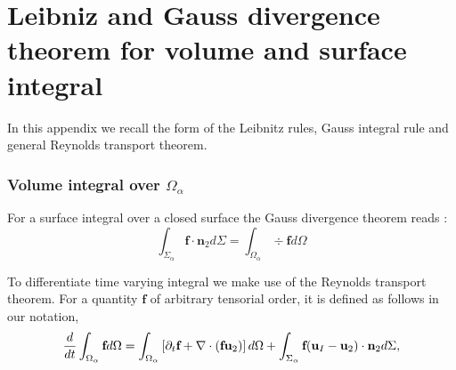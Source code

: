\section{Leibniz and Gauss divergence theorem for volume and surface integral}
\label{ap:math}


In this appendix we recall the form of the Leibnitz rules, Gauss integral rule and general Reynolds transport theorem. 
\subsubsection*{Volume integral over $\Omega_\alpha$}
For a surface integral over a closed surface the Gauss divergence theorem reads : 
\begin{equation}
    \int_{\Sigma_\alpha} \textbf{f} \cdot \textbf{n}_2 d\Sigma
    = \int_{\Omega_\alpha} \div \textbf{f}d\Omega
\end{equation}

To differentiate time varying integral we make use of the Reynolds transport theorem.
For a quantity $\textbf{f}$ of arbitrary tensorial order, it is defined  as follows in our notation, 
\begin{equation}
    \frac{d}{dt} \int_{\Omega_\alpha} \textbf{f} d\Omega
    = \int_{\Omega_\alpha}\left[\partial_t \textbf{f} + \mathbf{\nabla}\cdot\left(\textbf{f}\textbf{u}_2\right) \right]d\Omega
    + \int_{\Sigma_\alpha} \textbf{f} (\textbf{u}_I-\textbf{u}_2)\cdot \textbf{n}_2 d\Sigma,
    \label{eq:Reynolds}
\end{equation}


